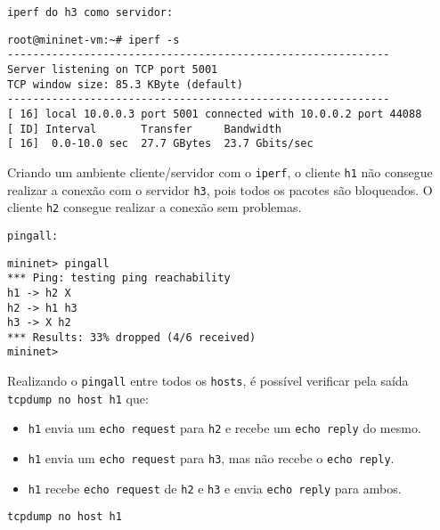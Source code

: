 \documentclass[12pt,letterpaper]{article}
\begin{document}
\begin{verbatim}
iperf do h3 como servidor:
\end{verbatim}

\begin{tiny}
\begin{verbatim}
root@mininet-vm:~# iperf -s
------------------------------------------------------------
Server listening on TCP port 5001
TCP window size: 85.3 KByte (default)
------------------------------------------------------------
[ 16] local 10.0.0.3 port 5001 connected with 10.0.0.2 port 44088
[ ID] Interval       Transfer     Bandwidth
[ 16]  0.0-10.0 sec  27.7 GBytes  23.7 Gbits/sec
\end{verbatim}
\end{tiny}

Criando um ambiente cliente/servidor com o \texttt{iperf}, o cliente \texttt{h1} não consegue realizar a conexão com o servidor \texttt{h3}, pois todos os pacotes são bloqueados. O cliente \texttt{h2} consegue realizar a conexão sem problemas.

\begin{verbatim}
pingall:
\end{verbatim}

\begin{tiny}
\begin{verbatim}
mininet> pingall
*** Ping: testing ping reachability
h1 -> h2 X 
h2 -> h1 h3 
h3 -> X h2 
*** Results: 33% dropped (4/6 received)
mininet> 
\end{verbatim}
\end{tiny}

Realizando o \texttt{pingall} entre todos os \texttt{hosts}, é possível verificar pela saída \texttt{tcpdump no host h1} que:
\begin{itemize}
    \item \texttt{h1} envia um \texttt{echo request} para \texttt{h2} e recebe um \texttt{echo reply} do mesmo.
    \item \texttt{h1} envia um \texttt{echo request} para \texttt{h3}, mas não recebe o \texttt{echo reply}.
    \item \texttt{h1} recebe \texttt{echo request} de \texttt{h2} e \texttt{h3} e envia \texttt{echo reply} para ambos.
\end{itemize}

\begin{verbatim}
tcpdump no host h1
\end{verbatim}
\end{document}
